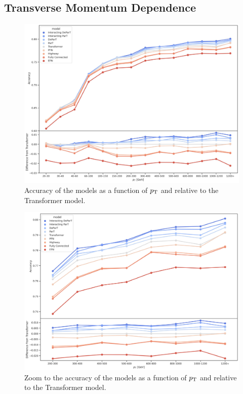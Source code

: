 \subsection{Transverse Momentum Dependence}
\label{sec:pt_dependance}
\begin{figure}[htb]
    \centering
    \includegraphics[width=1\linewidth]{src/plots/results/pT_dep/relative_accuracy.jpg}
    \caption{Accuracy of the models as a function of $p_\text{T}$ and relative to the Transformer model.}
    \label{fig:pt_dep_acc}
\end{figure}
\begin{figure}[htb]
    \centering
    \includegraphics[width=1\linewidth]{src/plots/results/pT_dep/relative_accuracy_zoom.jpg}
    \caption{Zoom to the accuracy of the models as a function of $p_\text{T}$ and relative to the Transformer model.}
    \label{fig:pt_dep_acc_zoom}
\end{figure}
